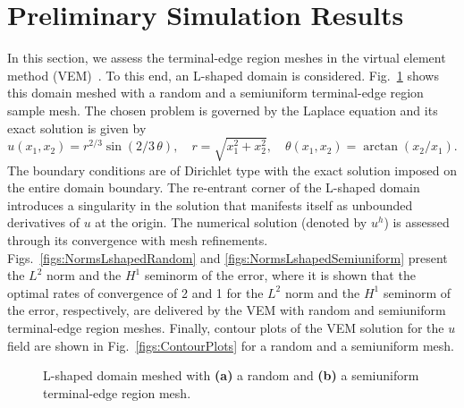 \section{Preliminary Simulation Results}
\label{sec:simulation_results}
In this section, we assess the terminal-edge region meshes in the virtual element method (VEM)~\cite{Basisprinciples}. To this end,
an L-shaped domain is considered. Fig.~\ref{figs:Lshaped} shows this domain meshed with a random and a semiuniform 
terminal-edge region sample mesh. The chosen problem is governed by the Laplace equation and
its exact solution is given by~\cite{MITCHELL2013350}
\begin{equation*}
u(x_1,x_2)=r^{2/3} \sin(2/3\,\theta), \quad r=\sqrt{x_1^2+x_2^2}, \quad \theta(x_1,x_2)=\arctan(x_2/x_1).
\end{equation*}
The boundary conditions are of Dirichlet type with the exact solution imposed on the entire domain boundary.
The re-entrant corner of the L-shaped domain introduces a singularity in the solution that manifests 
itself as unbounded derivatives of $u$ at the origin. The numerical solution (denoted by $u^h$) is assessed through
its convergence with mesh refinements. Figs.~\ref{figs:NormsLshapedRandom} and 
\ref{figs:NormsLshapedSemiuniform} present the $L^2$ norm and the $H^1$ seminorm
of the error, where it is shown that the optimal rates of convergence of 2 and 1 for the $L^2$ norm
and the $H^1$ seminorm of the error, respectively, are delivered by the VEM with random and 
semiuniform terminal-edge region meshes. Finally, contour plots of the VEM solution
for the $u$ field are shown in Fig.~\ref{figs:ContourPlots} for a random and a semiuniform mesh.

\begin{figure}[!bth]
\centering     %
{} \hspace{0.1cm}
\caption{L-shaped domain meshed with \textbf{(a)} a random and \textbf{(b)} a semiuniform terminal-edge region mesh.}
\label{figs:Lshaped} 
\end{figure}

